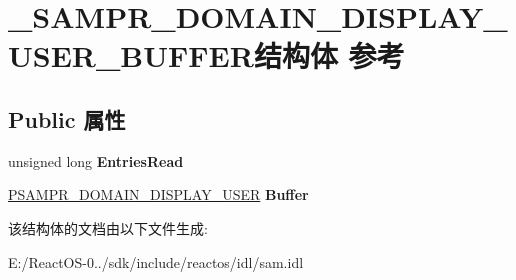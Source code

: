 \hypertarget{struct___s_a_m_p_r___d_o_m_a_i_n___d_i_s_p_l_a_y___u_s_e_r___b_u_f_f_e_r}{}\section{\+\_\+\+S\+A\+M\+P\+R\+\_\+\+D\+O\+M\+A\+I\+N\+\_\+\+D\+I\+S\+P\+L\+A\+Y\+\_\+\+U\+S\+E\+R\+\_\+\+B\+U\+F\+F\+E\+R结构体 参考}
\label{struct___s_a_m_p_r___d_o_m_a_i_n___d_i_s_p_l_a_y___u_s_e_r___b_u_f_f_e_r}
\subsection*{Public 属性}
\begin{DoxyCompactItemize}
\item 
\mbox{\label{struct___s_a_m_p_r___d_o_m_a_i_n___d_i_s_p_l_a_y___u_s_e_r___b_u_f_f_e_r_a806ea0837fe172addb2a2d4813c010ce}} 
unsigned long {\bfseries Entries\+Read}
\item 
\mbox{\label{struct___s_a_m_p_r___d_o_m_a_i_n___d_i_s_p_l_a_y___u_s_e_r___b_u_f_f_e_r_a6390b7bbfbad37b4250a5e68b96eea13}} 
\hyperlink{struct___s_a_m_p_r___d_o_m_a_i_n___d_i_s_p_l_a_y___u_s_e_r}{P\+S\+A\+M\+P\+R\+\_\+\+D\+O\+M\+A\+I\+N\+\_\+\+D\+I\+S\+P\+L\+A\+Y\+\_\+\+U\+S\+ER} {\bfseries Buffer}
\end{DoxyCompactItemize}


该结构体的文档由以下文件生成\+:\begin{DoxyCompactItemize}
\item 
E\+:/\+React\+O\+S-\/0../sdk/include/reactos/idl/sam.\+idl\end{DoxyCompactItemize}
